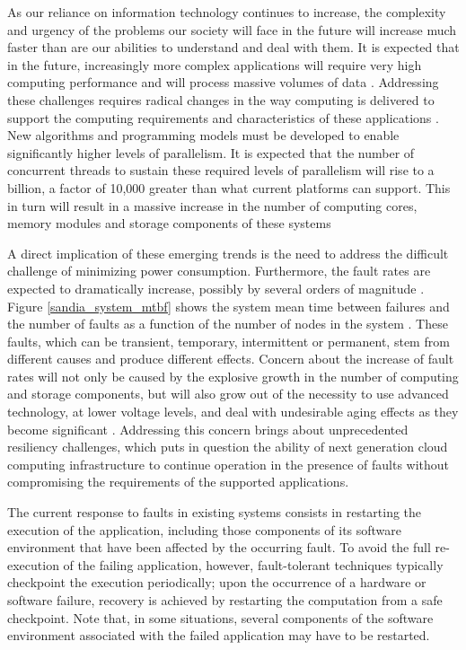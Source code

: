 As our reliance on information technology continues to increase, the
complexity and urgency of the problems our society will face in the
future will increase much faster than are our abilities to understand
and deal with them. It is expected that in the future, increasingly
more complex applications will require very high computing performance
and will process massive volumes of data 
\cite{expanding_universe_gantz_2008}. Addressing these challenges
requires radical changes in the way computing is delivered to support
the computing requirements and characteristics of these applications
\cite{sachs_ascr_2011}. New algorithms and programming models must be developed to enable
significantly higher levels of parallelism. It is expected that the
number of concurrent threads to sustain these required levels of
parallelism will rise to a billion, a factor of 10,000 greater than
what current platforms can support. This in turn will result in a
massive increase in the number of computing cores, memory modules and
storage components of these systems

A direct implication of these emerging trends is the need to address
the difficult challenge of minimizing power consumption. Furthermore,
the fault rates are expected to dramatically increase, possibly by
several orders of magnitude \cite{srinivasan_dsn_2004,
torrellas_extreme_2009}. Figure \ref{sandia_system_mtbf} shows the
system mean time between failures and the number of faults as a
function of the number of nodes in the
system \cite{riesen_sandia_2010}. These faults, which can be
transient, temporary, intermittent or permanent, stem from different
causes and produce different effects. Concern about the increase of
fault rates will not only be caused by the explosive growth in the
number of computing and storage components, but will also grow out of
the necessity to use advanced technology, at lower voltage levels, and
deal with undesirable aging effects as they become significant
\cite{srinivasan_dsn_2004}. Addressing this concern brings about unprecedented resiliency
challenges, which puts in question the ability of next generation
cloud computing infrastructure to continue operation in the presence
of faults without compromising the requirements of the supported
applications.

The current response to faults in existing systems consists in
restarting the execution of the application, including those
components of its software environment that have been affected by the
occurring fault. To avoid the full re-execution of the failing
application, however, fault-tolerant techniques typically checkpoint
the execution periodically; upon the occurrence of a hardware or
software failure, recovery is achieved by restarting the computation
from a safe checkpoint.  Note that, in some situations, several
components of the software environment associated with the failed
application may have to be restarted.

